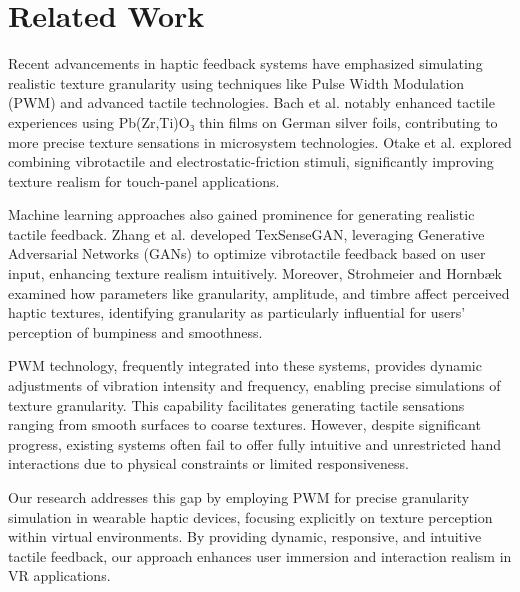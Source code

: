 \documentclass[graybox]{svmult}
\begin{document}
\section{Related Work}\label{sec:nssdn}
Recent advancements in haptic feedback systems have emphasized simulating realistic texture granularity using techniques like Pulse Width Modulation (PWM) and advanced tactile technologies. Bach et al. \cite{bach2023enhanced} notably enhanced tactile experiences using Pb(Zr,Ti)O₃ thin films on German silver foils, contributing to more precise texture sensations in microsystem technologies. Otake et al. \cite{otake2022vibrotactile} explored combining vibrotactile and electrostatic-friction stimuli, significantly improving texture realism for touch-panel applications.

Machine learning approaches also gained prominence for generating realistic tactile feedback. Zhang et al. \cite{zhang2022texsensegan} developed TexSenseGAN, leveraging Generative Adversarial Networks (GANs) to optimize vibrotactile feedback based on user input, enhancing texture realism intuitively. Moreover, Strohmeier and Hornbæk \cite{strohmeier2017generating} examined how parameters like granularity, amplitude, and timbre affect perceived haptic textures, identifying granularity as particularly influential for users' perception of bumpiness and smoothness.

PWM technology, frequently integrated into these systems, provides dynamic adjustments of vibration intensity and frequency, enabling precise simulations of texture granularity. This capability facilitates generating tactile sensations ranging from smooth surfaces to coarse textures. However, despite significant progress, existing systems often fail to offer fully intuitive and unrestricted hand interactions due to physical constraints or limited responsiveness.

Our research addresses this gap by employing PWM for precise granularity simulation in wearable haptic devices, focusing explicitly on texture perception within virtual environments. By providing dynamic, responsive, and intuitive tactile feedback, our approach enhances user immersion and interaction realism in VR applications.
\end{document}
